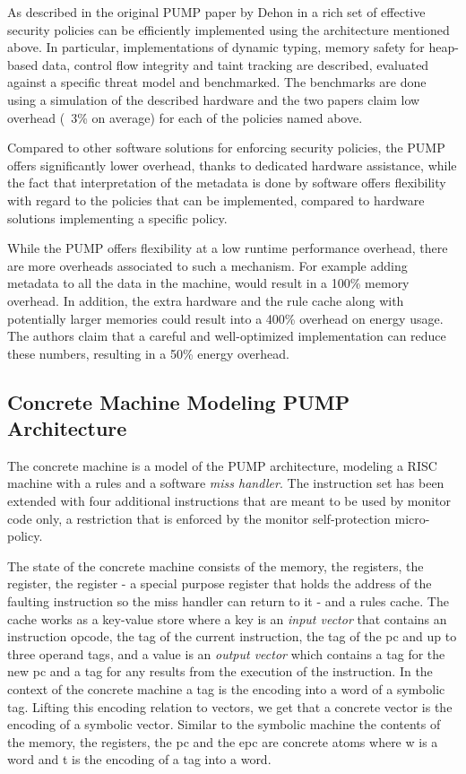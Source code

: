 As described in the original PUMP paper by Dehon \ETAL
in \cite{pump_hasp2014} a rich set of
effective security policies can be efficiently implemented using the
architecture mentioned above. In particular, implementations of
dynamic typing, memory safety for heap-based data, control flow
integrity and taint tracking are described, evaluated against a
specific threat model and benchmarked. The benchmarks are done using a
simulation of the described hardware and the two papers claim low
overhead (~3\% on average) for each of the policies named above.

Compared to other software solutions for enforcing security policies, the PUMP
offers significantly lower overhead, thanks to dedicated hardware assistance,
while the fact that interpretation of the metadata is done by software offers
flexibility with regard to the policies that can be implemented, compared to
hardware solutions implementing a specific policy.

While the PUMP offers flexibility at a low runtime performance
overhead, there are more overheads associated to such a mechanism. For
example adding metadata to all the data in the machine, would result
in a 100\% memory overhead.  In addition, the extra hardware and the
rule cache along with potentially larger memories could result into a
400\% overhead on energy usage. The authors
claim that a careful and well-optimized implementation can reduce
these numbers, resulting in a 50\% energy overhead.
%

\subsection{Concrete Machine Modeling PUMP Architecture}\label{sec:concrete}

The concrete machine is a model of the PUMP architecture, modeling a
RISC machine with a rules \cache and a software \emph{miss handler}.
The instruction set has been extended with four additional
instructions that are meant to be used by monitor code only, a
restriction that is enforced by the monitor self-protection
micro-policy.

The state of the concrete machine consists of the memory, the
registers, the \pc register, the \epc register - a special purpose
register that holds the address of the faulting instruction so the miss handler
can return to it - and a rules cache. The cache works as a key-value store
where a key is an \emph{input vector} that contains an instruction
opcode, the tag of the current instruction, the tag of the pc and up
to three operand tags, and a value is an \emph{output vector} which
contains a tag for the new pc and a tag for any results from the
execution of the instruction. In the context of the concrete machine a
tag is the encoding into a word of a symbolic tag. Lifting this
encoding relation to vectors, we get that a concrete vector is the
encoding of a symbolic vector. Similar to the
symbolic machine the contents of the memory, the registers, the pc and
the epc are concrete atoms  where w is a word and t is the
encoding of a tag into a word.

